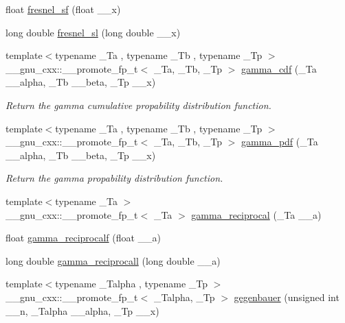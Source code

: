 \begin{DoxyCompactItemize}
\item 
float \hyperlink{group__gnu__math__spec__func_ga73450b8fd4abd5d8d3191dd6cbcda808}{fresnel\+\_\+sf} (float \+\_\+\+\_\+x)
\item 
long double \hyperlink{group__gnu__math__spec__func_ga5d6ac976fa316df9b943f92bafe1407d}{fresnel\+\_\+sl} (long double \+\_\+\+\_\+x)
\item 
{\footnotesize template$<$typename \+\_\+\+Ta , typename \+\_\+\+Tb , typename \+\_\+\+Tp $>$ }\\\+\_\+\+\_\+gnu\+\_\+cxx\+::\+\_\+\+\_\+promote\+\_\+fp\+\_\+t$<$ \+\_\+\+Ta, \+\_\+\+Tb, \+\_\+\+Tp $>$ \hyperlink{group__gnu__math__spec__func_gaf20f8e0778d43ad42d3c05e2e7896821}{gamma\+\_\+cdf} (\+\_\+\+Ta \+\_\+\+\_\+alpha, \+\_\+\+Tb \+\_\+\+\_\+beta, \+\_\+\+Tp \+\_\+\+\_\+x)
\begin{DoxyCompactList}\small\item\em Return the gamma cumulative propability distribution function. \end{DoxyCompactList}\item 
{\footnotesize template$<$typename \+\_\+\+Ta , typename \+\_\+\+Tb , typename \+\_\+\+Tp $>$ }\\\+\_\+\+\_\+gnu\+\_\+cxx\+::\+\_\+\+\_\+promote\+\_\+fp\+\_\+t$<$ \+\_\+\+Ta, \+\_\+\+Tb, \+\_\+\+Tp $>$ \hyperlink{group__gnu__math__spec__func_gae6eff89b253773f8d6851d8648b7cd51}{gamma\+\_\+pdf} (\+\_\+\+Ta \+\_\+\+\_\+alpha, \+\_\+\+Tb \+\_\+\+\_\+beta, \+\_\+\+Tp \+\_\+\+\_\+x)
\begin{DoxyCompactList}\small\item\em Return the gamma propability distribution function. \end{DoxyCompactList}\item 
{\footnotesize template$<$typename \+\_\+\+Ta $>$ }\\\+\_\+\+\_\+gnu\+\_\+cxx\+::\+\_\+\+\_\+promote\+\_\+fp\+\_\+t$<$ \+\_\+\+Ta $>$ \hyperlink{group__gnu__math__spec__func_ga5d0da7c5a9ba020da4ed87785a682133}{gamma\+\_\+reciprocal} (\+\_\+\+Ta \+\_\+\+\_\+a)
\item 
float \hyperlink{group__gnu__math__spec__func_ga10cccd5045490ac24590c094c43107d8}{gamma\+\_\+reciprocalf} (float \+\_\+\+\_\+a)
\item 
long double \hyperlink{group__gnu__math__spec__func_ga73bfcace13daa8b50e7e7e3f583a2eb0}{gamma\+\_\+reciprocall} (long double \+\_\+\+\_\+a)
\item 
{\footnotesize template$<$typename \+\_\+\+Talpha , typename \+\_\+\+Tp $>$ }\\\+\_\+\+\_\+gnu\+\_\+cxx\+::\+\_\+\+\_\+promote\+\_\+fp\+\_\+t$<$ \+\_\+\+Talpha, \+\_\+\+Tp $>$ \hyperlink{group__gnu__math__spec__func_ga793df814fb4e1b60e926ead0be14cc87}{gegenbauer} (unsigned int \+\_\+\+\_\+n, \+\_\+\+Talpha \+\_\+\+\_\+alpha, \+\_\+\+Tp \+\_\+\+\_\+x)

\end{DoxyCompactItemize}
